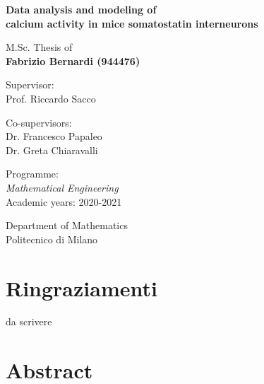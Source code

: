 \documentclass[12pt, a4paper]{report}
\newcommand{\myName}{Fabrizio Bernardi (944476)
}
\newcommand{\myTitle}{Data analysis and modeling of \\ calcium activity in   mice somatostatin interneurons}
\newcommand{\myDegree}{Programme: \protect\\ \textit{Mathematical Engineering} \\
Academic years: 2020-2021}
\newcommand{\myDepartment}{Department of Mathematics}
\newcommand{\myUni}{Politecnico di Milano}
\begin{document}
\begin{titlepage}
\begin{minipage}{\linewidth}
\begin{minipage}{0.45\linewidth}
\begin{figure}[H]
				\end{figure}
			\end{minipage}
		\end{minipage}
		
		\begin{addmargin}[0cm]{-0cm}
			\setlength{\parindent}{0pt}
			\vfill
			
			{\huge\bfseries\myTitle}
			
			\vspace{2cm}
			
			{\Large M.Sc. Thesis of\\[0.125cm]}
			{\LARGE\bfseries\myName}
			
			\vspace{1cm}
			
			\large
			Supervisor:\\[0.125cm]
			{\Large Prof. Riccardo Sacco}
			
			\vspace{0.5cm}
			
			\large
			Co-supervisors:\\[0.125cm]
			{\Large Dr. Francesco Papaleo \\
			Dr. Greta Chiaravalli}
			
			\vspace{1cm}
			
			\myDegree
			
			\vspace{0.5cm}
			
			\myDepartment \\
			\myUni
			
			\vfill
		\end{addmargin}
	\end{titlepage}
	
	
	\chapter*{Ringraziamenti}
	
	da scrivere

	
	
	\chapter*{Abstract}
	
\end{document}
